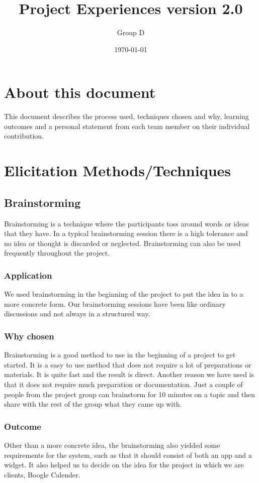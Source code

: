 \documentclass[a4paper]{article}
\title{Project Experiences version 2.0}
\author{Group D}
\date{\today}
\begin{document}
	\maketitle
	\thispagestyle{empty}
	\setcounter{page}{0}
	\pagebreak
	\tableofcontents
	\pagebreak
	
  \section{About this document}
  This document describes the process used, techniques chosen and why, learning outcomes and a personal statement from each team member on their individual contribution.
  \section{Elicitation Methods/Techniques}
  \subsection{Brainstorming}
Brainstorming is a technique where the participants toss around words or ideas that they have. In a typical brainstorming session there is a high tolerance and no idea or thought is discarded or neglected. Brainstorming can also be used frequently throughout the project.
    \subsubsection{Application}
We used brainstorming in the beginning of the project to put the idea in to a more concrete form. Our brainstorming sessions have been like ordinary discussions and not always in a structured way.
    \subsubsection{Why chosen}
Brainstorming is a good method to use in the beginning of a project to get started. It is a easy to use method that does not require a lot of preparations or materials. It is quite fast and the result is direct. Another reason we have used is that it does not require much preparation or documentation. Just a couple of people from the project group can brainstorm for 10 minutes on a topic and then share with the rest of the group what they came up with.

    \subsubsection{Outcome}
    Other than a more concrete idea, the brainstorming also yielded some requirements for the system, such as that it should consist of both an app and a widget. It also helped us to decide on the idea for the project in which we are clients, Boogle Calender.
\end{document}
